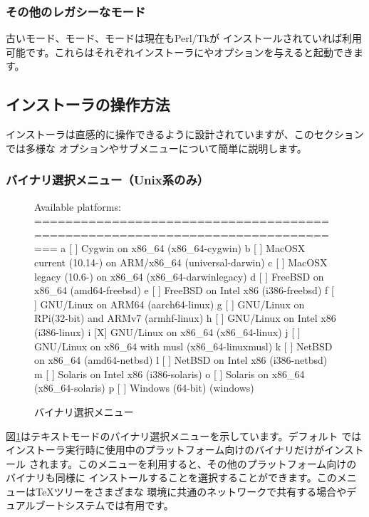 \documentclass[uplatex,dvipdfmx,12pt,tombow]{jsarticle}
\begin{document}
\subsubsection{その他のレガシーなモード}

古いモード、モード、モードは現在もPerl/Tkが
インストールされていれば利用可能です。これらはそれぞれインストーラにやオプションを与えると起動できます。

\subsection{インストーラの操作方法}
\label{sec:runinstall}

インストーラは直感的に操作できるように設計されていますが、このセクションでは多様な
オプションやサブメニューについて簡単に説明します。

\subsubsection{バイナリ選択メニュー（Unix系のみ）}
\label{sec:binary}

\begin{figure}[tb]
\begin{boxedverbatim}
Available platforms:
===============================================================================
   a [ ] Cygwin on x86_64 (x86_64-cygwin)
   b [ ] MacOSX current (10.14-) on ARM/x86_64 (universal-darwin)
   c [ ] MacOSX legacy (10.6-) on x86_64 (x86_64-darwinlegacy)
   d [ ] FreeBSD on x86_64 (amd64-freebsd)
   e [ ] FreeBSD on Intel x86 (i386-freebsd)
   f [ ] GNU/Linux on ARM64 (aarch64-linux)
   g [ ] GNU/Linux on RPi(32-bit) and ARMv7 (armhf-linux)
   h [ ] GNU/Linux on Intel x86 (i386-linux)
   i [X] GNU/Linux on x86_64 (x86_64-linux)
   j [ ] GNU/Linux on x86_64 with musl (x86_64-linuxmusl)
   k [ ] NetBSD on x86_64 (amd64-netbsd)
   l [ ] NetBSD on Intel x86 (i386-netbsd)
   m [ ] Solaris on Intel x86 (i386-solaris)
   o [ ] Solaris on x86_64 (x86_64-solaris)
   p [ ] Windows (64-bit) (windows)
\end{boxedverbatim}
\vspace{-1zh}
\caption{バイナリ選択メニュー}\label{fig:bin-text}
\end{figure}

図\ref{fig:bin-text}はテキストモードのバイナリ選択メニューを示しています。デフォルト
ではインストーラ実行時に使用中のプラットフォーム向けのバイナリだけがインストール
されます。このメニューを利用すると、その他のプラットフォーム向けのバイナリも同様に
インストールすることを選択することができます。このメニューは\TeX ツリーをさまざまな
環境に共通のネットワークで共有する場合やデュアルブートシステムでは有用です。
\end{document}
